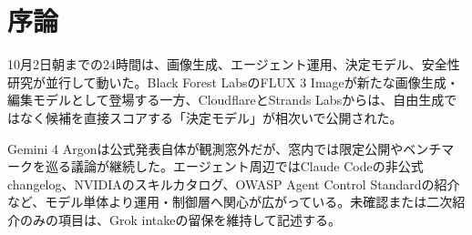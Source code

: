 \section*{序論}
10月2日朝までの24時間は、画像生成、エージェント運用、決定モデル、安全性研究が並行して動いた。Black Forest LabsのFLUX 3 Imageが新たな画像生成・編集モデルとして登場する一方、CloudflareとStrands Labsからは、自由生成ではなく候補を直接スコアする「決定モデル」が相次いで公開された。

Gemini 4 Argonは公式発表自体が観測窓外だが、窓内では限定公開やベンチマークを巡る議論が継続した。エージェント周辺ではClaude Codeの非公式changelog、NVIDIAのスキルカタログ、OWASP Agent Control Standardの紹介など、モデル単体より運用・制御層へ関心が広がっている。未確認または二次紹介のみの項目は、Grok intakeの留保を維持して記述する。
